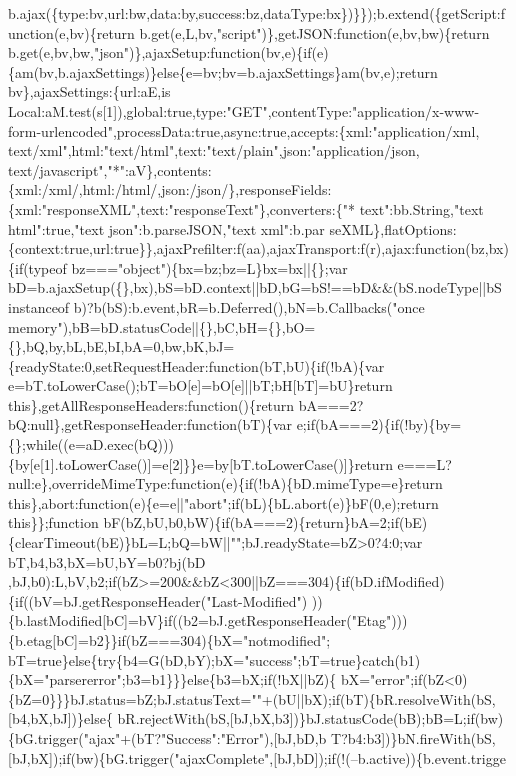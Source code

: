 \begin{DoxyCode}
{       b.ajax(\{type:bv,url:bw,data:by,success:bz,dataType:bx\})\}\});b.extend(\{getScript:function(e,bv)\{return b.get(e,L,bv,"script")\},getJSON:function(e,bv,bw)\{return
       b.get(e,bv,bw,"json")\},ajaxSetup:function(bv,e)\{if(e)\{am(bv,b.ajaxSettings)\}else\{e=bv;bv=b.ajaxSettings\}am(bv,e);return
       bv\},ajaxSettings:\{url:aE,is
      Local:aM.test(s[1]),global:true,type:"GET",contentType:"application/x-www-form-urlencoded",processData:true,async:true,accepts:\{xml:"application/xml,
       text/xml",html:"text/html",text:"text/plain",json:"application/json,
       text/javascript","*":aV\},contents:\{xml:/xml/,html:/html/,json:/json/\},responseFields:\{xml:"responseXML",text:"responseText"\},converters:\{"* text":bb.String,"text html":true,"text json":b.parseJSON,"text
       xml":b.par
      seXML\},flatOptions:\{context:true,url:true\}\},ajaxPrefilter:f(aa),ajaxTransport:f(r),ajax:function(bz,bx)\{if(typeof bz==="object")\{bx=bz;bz=L\}bx=bx||\{\};var
       bD=b.ajaxSetup(\{\},bx),bS=bD.context||bD,bG=bS!==bD&&(bS.nodeType||bS instanceof b)?b(bS):b.event,bR=b.Deferred(),bN=b.Callbacks("once
       memory"),bB=bD.statusCode||\{\},bC,bH=\{\},bO=\{\},bQ,by,bL,bE,bI,bA=0,bw,bK,bJ=\{readyState:0,setRequestHeader:function(bT,bU)\{if(!bA)\{var
       e=bT.toLowerCase();bT=bO[e]=bO[e]||bT;bH[bT]=bU\}return this\},getAllResponseHeaders:function()\{return
       bA===2?bQ:null\},getResponseHeader:function(bT)\{var
       e;if(bA===2)\{if(!by)\{by=\{\};while((e=aD.exec(bQ)))\{by[e[1].toLowerCase()]=e[2]\}\}e=by[bT.toLowerCase()]\}return e===L?null:e\},overrideMimeType:function(e)\{if(!bA)\{bD.mimeType=e\}return
       this\},abort:function(e)\{e=e||"abort";if(bL)\{bL.abort(e)\}bF(0,e);return this\}\};function
       bF(bZ,bU,b0,bW)\{if(bA===2)\{return\}bA=2;if(bE)\{clearTimeout(bE)\}bL=L;bQ=bW||"";bJ.readyState=bZ>0?4:0;var
       bT,b4,b3,bX=bU,bY=b0?bj(bD
      ,bJ,b0):L,bV,b2;if(bZ>=200&&bZ<300||bZ===304)\{if(bD.ifModified)\{if((bV=bJ.getResponseHeader("Last-Modified")
      ))\{b.lastModified[bC]=bV\}if((b2=bJ.getResponseHeader("Etag")))\{b.etag[bC]=b2\}\}if(bZ===304)\{bX="notmodified";
      bT=true\}else\{try\{b4=G(bD,bY);bX="success";bT=true\}catch(b1)\{bX="parsererror";b3=b1\}\}\}else\{b3=bX;if(!bX||bZ)\{
      bX="error";if(bZ<0)\{bZ=0\}\}\}bJ.status=bZ;bJ.statusText=""+(bU||bX);if(bT)\{bR.resolveWith(bS,[b4,bX,bJ])\}else\{
      bR.rejectWith(bS,[bJ,bX,b3])\}bJ.statusCode(bB);bB=L;if(bw)\{bG.trigger("ajax"+(bT?"Success":"Error"),[bJ,bD,b
      T?b4:b3])\}bN.fireWith(bS,[bJ,bX]);if(bw)\{bG.trigger("ajaxComplete",[bJ,bD]);if(!(--b.active))\{b.event.trigge
}
\end{DoxyCode}
